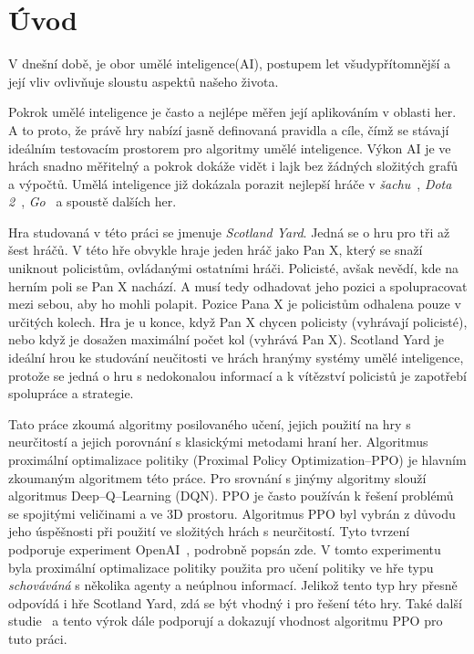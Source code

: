\newtheorem{definition}{\textbf{Definice}}

\chapter{Úvod}
\label{ch:uvod}

V dnešní době, je obor umělé inteligence(AI), postupem let všudypřítomnější a její vliv ovlivňuje sloustu aspektů našeho života.

Pokrok umělé inteligence je často a nejlépe měřen její aplikováním v oblasti her.
A to proto, že právě hry nabízí jasně definovaná pravidla a cíle, čímž se stávají ideálním testovacím prostorem pro algoritmy umělé inteligence.
Výkon AI je ve hrách snadno měřitelný a pokrok dokáže vidět i lajk bez žádných složitých grafů a výpočtů.
Umělá inteligence již dokázala porazit nejlepší hráče v \textit{šachu}~\cite{DeepBlue}, \textit{Dota 2}~\cite{Dota2}, \textit{Go}~\cite{AlphaGo} a spoustě dalších her.

Hra studovaná v této práci se jmenuje \emph{Scotland Yard}.
Jedná se o hru pro tři až šest hráčů.
V této hře obvykle hraje jeden hráč jako Pan X, který se snaží uniknout policistům, ovládanými ostatními hráči.
Policisté, avšak nevědí, kde na herním poli se Pan X nachází.
A musí tedy odhadovat jeho pozici a spolupracovat mezi sebou, aby ho mohli polapit.
Pozice Pana X je policistům odhalena pouze v určitých kolech.
Hra je u konce, když Pan X chycen policisty (vyhrávají policisté), nebo když je dosažen maximální počet kol (vyhrává Pan X).
Scotland Yard je ideální hrou ke studování neučitosti ve hrách hranýmy systémy umělé inteligence, protože se jedná o hru s nedokonalou informací a k vítězství policistů je zapotřebí spolupráce a strategie.

Tato práce zkoumá algoritmy posilovaného učení, jejich použití na hry s neurčitostí a jejich porovnání s klasickými metodami hraní her.
Algoritmus proximální optimalizace politiky (Proximal Policy Optimization--PPO) je hlavním zkoumaným algoritmem této práce.
Pro srovnání s jinýmy algoritmy slouží algoritmus Deep--Q--Learning (DQN).
PPO je často používán k řešení problémů se spojitými veličinami a ve 3D prostoru.
Algoritmus PPO byl vybrán z důvodu jeho úspěšnosti při použití ve složitých hrách s neurčitostí.
Tyto tvrzení podporuje experiment OpenAI~\cite{PPO_Hide_Seek_page}, podrobně popsán zde\cite{PPO_Hide_Seek_paper}.
V tomto experimentu byla proximální optimalizace politiky použita pro učení politiky ve hře typu \textit{schováváná} s několika agenty a neúplnou informací.
Jelikož tento typ hry přesně odpovídá i hře Scotland Yard, zdá se být vhodný i pro řešení této hry.
Také další studie~\cite{Manille} a \cite{Dota2} tento výrok dále podporují a dokazují vhodnost algoritmu PPO pro tuto práci.

